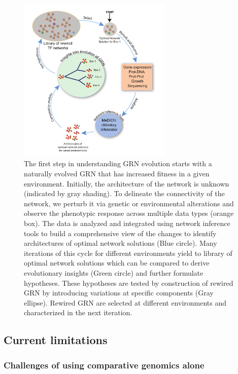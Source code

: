 \begin{figure}[h!]
    \centering
    \includegraphics[width=0.65\textwidth]{figures/review_figure3}
 	\caption[Systems approaches to study GRN evolution]{The first step in understanding GRN evolution starts with a naturally evolved GRN that has increased fitness in a given environment. Initially, the architecture of the network is unknown (indicated by gray shading). To delineate the connectivity of the network, we perturb it via genetic or environmental alterations and observe the phenotypic response across multiple data types (orange box). The data is analyzed and integrated using network inference tools to build a comprehensive view of the changes to identify architectures of optimal network solutions (Blue circle). Many iterations of this cycle for different environments yield to library of optimal network solutions which can be compared to derive evolutionary insights (Green circle) and further formulate hypotheses. These hypotheses are tested by construction of rewired GRN by introducing variations at specific components (Gray ellipse). Rewired GRN are selected at different environments and characterized in the next iteration.
}
    \label{fig:chap6:network_inference}
\end{figure}

\subsection{Current limitations}

\subsubsection{Challenges of using comparative genomics alone}

